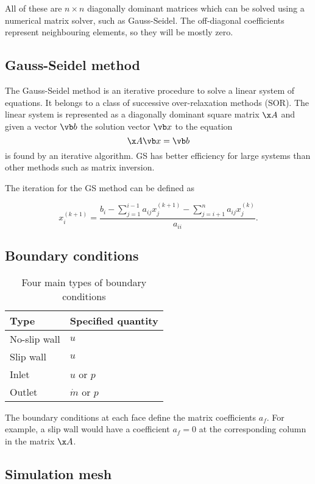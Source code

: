 \documentclass[12pt]{article}
\begin{document}
All of these are $n \times n$ diagonally dominant matrices which can be solved using a numerical matrix solver, such as Gauss-Seidel. The off-diagonal coefficients represent neighbouring elements, so they will be mostly zero.

\subsection{Gauss-Seidel method}

The Gauss-Seidel method is an iterative procedure to solve a linear system of equations. It belongs to a class of successive over-relaxation methods (SOR). The linear system is represented as a diagonally dominant square matrix $\x A$ and given a vector $\vb b$ the solution vector $\vb x$ to the equation
$$
\x A \vb x = \vb b
$$
is found by an iterative algorithm. GS has better efficiency for large systems than other methods such as matrix inversion.

The iteration for the GS method can be defined as \cite[p.~510]{golub}

\begin{equation}
  x_i^{(k + 1)} = \frac{b_i - \sum_{j=1}^{i-1} a_{ij} x_j^{(k + 1)} - \sum_{j=i+1}^{n} a_{ij} x_j^{(k)}}{a_{ii}}.
\end{equation}

\subsection{Boundary conditions}

\begin{table}[H]
  \centering
  \begin{tabular}{| l | l |}
    \hline
    Type & Specified quantity \\
    \hline
    No-slip wall & $u$ \\
    \hline
    Slip wall & $u$ \\
    \hline
    Inlet & $u$ or $p$ \\
    \hline
    Outlet & $\dot m$ or $p$\\
    \hline
  \end{tabular}
  \caption{Four main types of boundary conditions}
\end{table}
The boundary conditions at each face define the matrix coefficients $a_f$. For example, a slip wall would have a coefficient $a_f = 0$ at the corresponding column in the matrix $\x A$.

\subsection{Simulation mesh}
\end{document}
